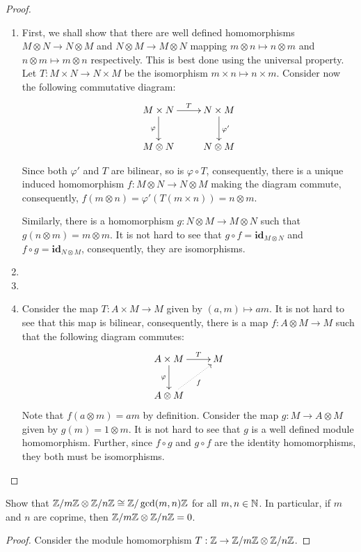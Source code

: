 \begin{proof}
\begin{enumerate}[label=(\alph*)]
\item First, we shall show that there are well defined homomorphisms $M\otimes N\to N\otimes M$ and $N\otimes M\to M\otimes N$ mapping $m\otimes n\mapsto n\otimes m$ and $n\otimes m\mapsto m\otimes n$ respectively. This is best done using the universal property. Let $T: M\times N\to N\times M$ be the isomorphism $m\times n\mapsto n\times m$. Consider now the following commutative diagram: 
\begin{equation*}
\xymatrix{
    M\times N\ar[d]_\varphi\ar[r]^-T & N\times M\ar[d]^{\varphi'}\\
    M\otimes N & N\otimes M
}
\end{equation*}

Since both $\varphi'$ and $T$ are bilinear, so is $\varphi\circ T$, consequently, there is a unique induced homomorphism $f: M\otimes N\to N\otimes M$ making the diagram commute, consequently, $f(m\otimes n) = \varphi'(T(m\times n)) = n\otimes m$.

Similarly, there is a homomorphism $g: N\otimes M\to M\otimes N$ such that $g(n\otimes m) = m\otimes m$. It is not hard to see that $g\circ f = \mathbf{id}_{M\otimes N}$ and $f\circ g = \mathbf{id}_{N\otimes M}$, consequently, they are isomorphisms.

\item 

\item

\item Consider the map $T: A\times M\to M$ given by $(a,m)\mapsto am$. It is not hard to see that this map is bilinear, consequently, there is a map $f: A\otimes M\to M$ such that the following diagram commutes: 
\begin{equation*}
\xymatrix {
    A\times M\ar[r]^-T\ar[d]_\varphi & M\\
    A\otimes M\ar@{.>}[ru]_-{f}
}
\end{equation*}
Note that $f(a\otimes m) = am$ by definition. Consider the map $g: M\to A\otimes M$ given by $g(m) = 1\otimes m$. It is not hard to see that $g$ is a well defined module homomorphism. Further, since $f\circ g$ and $g\circ f$ are the identity homomorphisms, they both must be isomorphisms.
\end{enumerate}
\end{proof}

\begin{example}
    Show that $\mathbb{Z}/m\mathbb{Z}\otimes\mathbb{Z}/n\mathbb{Z}\cong\mathbb{Z}/\gcd(m,n)\mathbb{Z}$ for all $m,n\in\mathbb{N}$. In particular, if $m$ and $n$ are coprime, then $\mathbb{Z}/m\mathbb{Z}\otimes\mathbb{Z}/n\mathbb{Z} = 0$.
\end{example}
\begin{proof}
    Consider the module homomorphism $T:\mathbb{Z}\to\mathbb{Z}/m\mathbb{Z}\otimes\mathbb{Z}/n\mathbb{Z}$. 
\end{proof}

